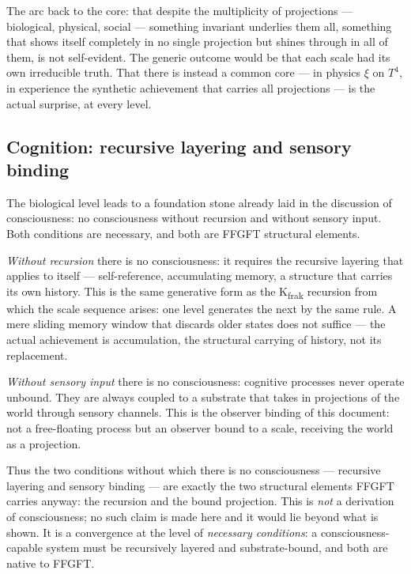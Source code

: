 The arc back to the core: that despite the multiplicity of projections ---
biological, physical, social --- something invariant underlies them all,
something that shows itself completely in no single projection but shines
through in all of them, is not self-evident. The generic outcome would be
that each scale had its own irreducible truth. That there is instead a common
core --- in physics $\xi$ on $T^4$, in experience the synthetic achievement
that carries all projections --- is the actual surprise, at every level.

\subsection*{Cognition: recursive layering and sensory binding}

The biological level leads to a foundation stone already laid in the
discussion of consciousness: no consciousness without recursion and without
sensory input. Both conditions are necessary, and both are FFGFT structural
elements.

\emph{Without recursion} there is no consciousness: it requires the recursive
layering that applies to itself --- self-reference, accumulating memory, a
structure that carries its own history. This is the same generative form as
the K\textsubscript{frak} recursion from which the scale sequence arises: one
level generates the next by the same rule. A mere sliding memory window that
discards older states does not suffice --- the actual achievement is
accumulation, the structural carrying of history, not its replacement.

\emph{Without sensory input} there is no consciousness: cognitive processes
never operate unbound. They are always coupled to a substrate that takes in
projections of the world through sensory channels. This is the observer
binding of this document: not a free-floating process but an observer bound to
a scale, receiving the world as a projection.

Thus the two conditions without which there is no consciousness --- recursive
layering and sensory binding --- are exactly the two structural elements FFGFT
carries anyway: the recursion and the bound projection. This is \emph{not} a
derivation of consciousness; no such claim is made here and it would lie
beyond what is shown. It is a convergence at the level of \emph{necessary
conditions}: a consciousness-capable system must be recursively layered and
substrate-bound, and both are native to FFGFT.


